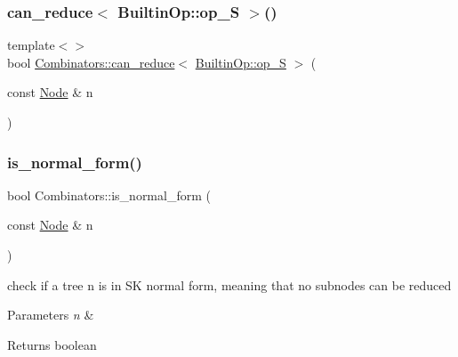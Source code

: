 \mbox{\label{namespace_combinators_a20138fc667812b7b36885b52387f85e0}} 
\subsubsection{\texorpdfstring{can\+\_\+reduce$<$ Builtin\+Op\+::op\+\_\+\+S $>$()}{can\_reduce< BuiltinOp::op\_S >()}}
{\footnotesize\ttfamily template$<$$>$ \\
bool \hyperlink{namespace_combinators_aa3c93f1edab6764d54dda56aafac9cd3}{Combinators\+::can\+\_\+reduce}$<$ \hyperlink{_instruction_8h_af2fb7c87c5854c5733d7bb0506b06de7ae77dc89233eb1fc00d3d1f1a1c1c462e}{Builtin\+Op\+::op\+\_\+S} $>$ (\begin{DoxyParamCaption}\item[{const \hyperlink{class_node}{Node} \&}]{n }\end{DoxyParamCaption})}

\mbox{\label{namespace_combinators_a29877c1bfde5b9807fd7a7538efe9e0c}} 
\subsubsection{\texorpdfstring{is\+\_\+normal\+\_\+form()}{is\_normal\_form()}}
{\footnotesize\ttfamily bool Combinators\+::is\+\_\+normal\+\_\+form (\begin{DoxyParamCaption}\item[{const \hyperlink{class_node}{Node} \&}]{n }\end{DoxyParamCaption})}



check if a tree n is in SK normal form, meaning that no subnodes can be reduced 


\begin{DoxyParams}{Parameters}
{\em n} & \\
\hline
\end{DoxyParams}
\begin{DoxyReturn}{Returns}
boolean 
\end{DoxyReturn}
\mbox{\label{namespace_combinators_a6abc966e0ab0f2aa8170712f32541458}} 
